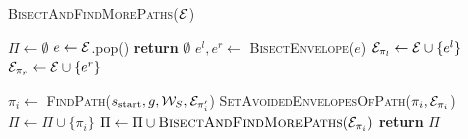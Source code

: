 \documentclass[a4paper]{report}
\begin{document}
\setlength{\textfloatsepsave}{\textfloatsep}
\setlength{\textfloatsep}{0pt}
\begin{algorithm}[t]
\caption{\textsc{BisectAndFindMorePaths($\mathcal{E}$)}} \label{alg2}
\begin{algorithmic}[1]
    \State $\Pi \leftarrow \emptyset$
    \State $e \leftarrow \mathcal{E}$.pop()     
    \label{alg2:pop}
        
        \State \textbf{return} $\emptyset$  
    \EndIf
    \State $e^{l},e^{r} \leftarrow$ \textsc{BisectEnvelope($e$)} \label{alg:2:bisect}
    \State $\mathcal{E}_{\pi_l} \leftarrow \mathcal{E} \cup \{e^l\}$
    \State $\mathcal{E}_{\pi_r} \leftarrow \mathcal{E} \cup \{e^r\}$
    
        \State $\pi_i \leftarrow$ \textsc{FindPath}($s_{\textrm{start}},g,\mathcal{W}_S,\mathcal{E}_{\pi_i'}$) 
            \State \textsc{SetAvoidedEnvelopesOfPath($\pi_i, \mathcal{E}_{\pi_i}$)}
            \State $\Pi \leftarrow \Pi \cup \{\pi_i\}$
        \Else
            \State $\Pi \leftarrow \Pi \cup \textsc{BisectAndFindMorePaths}(\mathcal{E}_{\pi_i})$
        \EndIf
    \EndFor
    \State \textbf{return} $\Pi$
    
\end{algorithmic}
\end{algorithm}
\setlength{\textfloatsep}{5pt}
\end{document}
